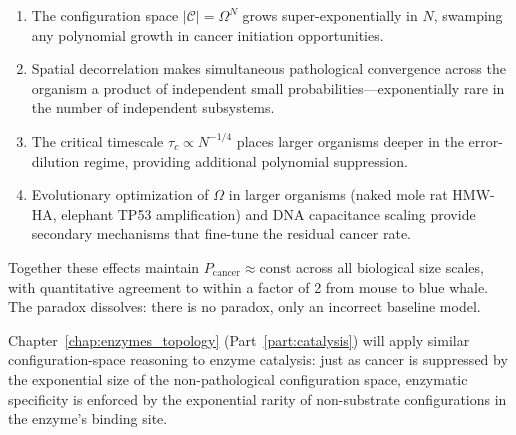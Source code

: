 \begin{enumerate}[label=(\arabic*)]
  \item The configuration space $|\mathcal{C}| = \Omega^N$ grows super-exponentially
        in $N$, swamping any polynomial growth in cancer initiation opportunities.
  \item Spatial decorrelation makes simultaneous pathological convergence across
        the organism a product of independent small probabilities---exponentially
        rare in the number of independent subsystems.
  \item The critical timescale $\tau_c \propto N^{-1/4}$ places larger organisms
        deeper in the error-dilution regime, providing additional polynomial
        suppression.
  \item Evolutionary optimization of $\Omega$ in larger organisms (naked mole
        rat HMW-HA, elephant TP53 amplification) and DNA capacitance scaling
        provide secondary mechanisms that fine-tune the residual cancer rate.
\end{enumerate}

Together these effects maintain $P_{\mathrm{cancer}} \approx \mathrm{const}$
across all biological size scales, with quantitative agreement to within a factor
of 2 from mouse to blue whale. The paradox dissolves: there is no paradox, only
an incorrect baseline model.

Chapter~\ref{chap:enzymes_topology} (Part~\ref{part:catalysis}) will apply
similar configuration-space reasoning to enzyme catalysis: just as cancer is
suppressed by the exponential size of the non-pathological configuration space,
enzymatic specificity is enforced by the exponential rarity of non-substrate
configurations in the enzyme's binding site.

